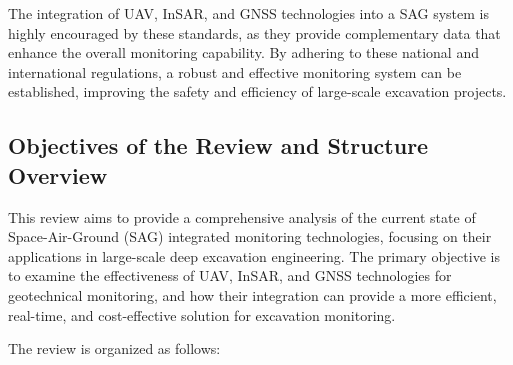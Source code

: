 \documentclass[preprint,11pt,authoryear,3p]{elsarticle}
\begin{document}
The integration of UAV, InSAR, and GNSS technologies into a SAG system is highly encouraged by these standards, as they provide complementary data that enhance the overall monitoring capability. By adhering to these national and international regulations, a robust and effective monitoring system can be established, improving the safety and efficiency of large-scale excavation projects.

\subsection{Objectives of the Review and Structure Overview}

This review aims to provide a comprehensive analysis of the current state of Space-Air-Ground (SAG) integrated monitoring technologies, focusing on their applications in large-scale deep excavation engineering. The primary objective is to examine the effectiveness of UAV, InSAR, and GNSS technologies for geotechnical monitoring, and how their integration can provide a more efficient, real-time, and cost-effective solution for excavation monitoring.

The review is organized as follows:
\end{document}
